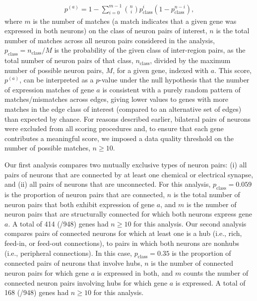 \documentclass[10pt,letterpaper]{article}
\begin{document}
\begin{eqnarray}
	\label{eq:CBinomialProbability}
     p^{(a)} = 1 - \sum_{i=0}^{m-1}\binom{n}{i} p_\mathrm{class}^{i}(1-p_\mathrm{class}^{n-i}),
\end{eqnarray}
where $m$ is the number of matches (a match indicates that a given gene was expressed in both neurons) on the class of neuron pairs of interest, $n$ is the total number of matches across all neuron pairs considered in the analysis, $p_\mathrm{class} = n_\mathrm{class}/M$ is the probability of the given class of inter-region pairs, as the total number of neuron pairs of that class, $n_\mathrm{class}$, divided by the maximum number of possible neuron pairs, $M$, for a given gene, indexed with $a$.
This score, $p^{(a)}$, can be interpreted as a $p$-value under the null hypothesis that the number of expression matches of gene $a$ is consistent with a purely random pattern of matches/mismatches across edges, giving lower values to genes with more matches in the edge class of interest (compared to an alternative set of edges) than expected by chance.
For reasons described earlier, bilateral pairs of neurons were excluded from all scoring procedures and, to ensure that each gene contributes a meaningful score, we imposed a data quality threshold on the number of possible matches, $n \geq 10$.

Our first analysis compares two mutually exclusive types of neuron pairs:
(i) all pairs of neurons that are connected by at least one chemical or electrical synapse, and
(ii) all pairs of neurons that are unconnected.
For this analysis, $p_\mathrm{class} = 0.059$ is the proportion of neuron pairs that are connected, $n$ is the total number of neuron pairs that both exhibit expression of gene $a$, and $m$ is the number of neuron pairs that are structurally connected for which both neurons express gene $a$.
A total of 414 (/948) genes had $n \geq 10$ for this analysis.
Our second analysis compares pairs of connected neurons for which at least one is a hub (i.e., rich, feed-in, or feed-out connections), to pairs in which both neurons are nonhubs (i.e., peripheral connections).
In this case, $p_\mathrm{class} = 0.35$ is the proportion of connected pairs of neurons that involve hubs, $n$ is the number of connected neuron pairs for which gene $a$ is expressed in both, and $m$ counts the number of connected neuron pairs involving hubs for which gene $a$ is expressed.
A total of 168 (/948) genes had $n \geq 10$ for this analysis.
\end{document}

